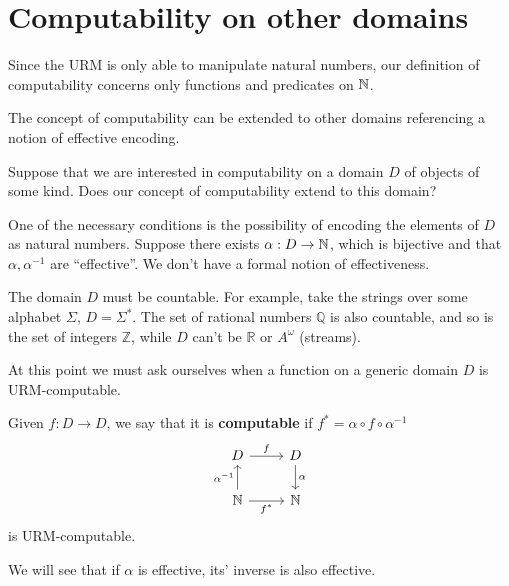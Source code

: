 \chapter{Computability on other domains}

Since the URM is only able to manipulate natural numbers, our definition of computability concerns only functions and predicates on $\mathbb{N}$.

The concept of computability can be extended to other domains referencing a notion of effective encoding.

Suppose that we are interested in computability on a  domain $D$ of objects of some kind. 
Does our concept of computability extend to this domain? 

One of the necessary conditions is the possibility of encoding the elements of $D$ as natural numbers. 
Suppose there exists $\alpha: D \rightarrow \mathbb{N}$, which is bijective and that $\alpha, \alpha^{-1}$ are ``effective''. 
We don't have a formal notion of effectiveness.

The domain $D$ must be countable. For example, take the strings over some alphabet $\Sigma$, $D = \Sigma^*$. 
The set of rational numbers $\mathbb{Q}$ is also countable, and so is the set of integers $\mathbb{Z}$, while $D$ can't be  $\mathbb{R}$ or $A^\omega$ (streams).

At this point we must ask ourselves when a function on a generic domain $D$ is URM-computable. 

\begin{definition}
  Given $f: D \rightarrow D$, we say that it is \textbf{computable} if $ f^* = \alpha \circ f \circ \alpha^{-1}$
  \[\begin{tikzcd}
    D & D \\
    \nat & \nat
    \arrow["{\alpha^{-1}}", from=2-1, to=1-1]
    \arrow["f", from=1-1, to=1-2]
    \arrow["\alpha", from=1-2, to=2-2]
    \arrow["{f^*}"', from=2-1, to=2-2]
  \end{tikzcd}\]
  is URM-computable.
\end{definition}

We will see that if $\alpha$ is effective, its' inverse is also effective.

